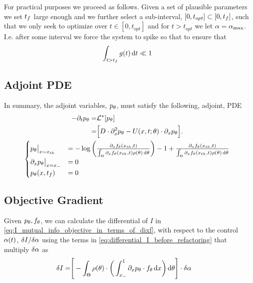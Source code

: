 \def \topt {{ t_{opt}}}

For practical purposes we proceed as follows. Given a set of plausible
parameters we set ${t_f}$ large enough and we further select a sub-interval,
$[0, \topt] \subset [0, \tf]$, such that we only seek to optimize over $t\in
[0, \topt]$ and for $t > \topt$ we let $\alpha= { \alpha_{\textrm{max}} }$. I.e. after some interval we
force the system to spike so that to ensure that $$\int_{t>{t_f}} g(t) \, \mathrm{d} t
\ll 1$$

\subsection{Adjoint PDE}
In summary, the adjoint variables, $p_{ \theta}$, must satisfy the following, adjoint,
PDE
\begin{equation}
\begin{gathered}
\begin{aligned}
-\di_t p_\th =&  \Lstar[p_\th]
\\ 		=&  \Big[ D\cdot \di^2_x p_\th - U(x,t;\th)   \cdot \di_x p_\th \Big].
\end{aligned}
\\
\begin{cases}
	p_\th \big|_{x=\xth} &=  -\log\left( \frac{\di_xf_\th(\xth, t)}
						{\int_\Theta \di_xf_\th(\xth, t)\rho(\th)\intd{\th} } \right) 
							- 1 
							+ \frac{\di_xf_\th(\xth, t)}
				   					{\int_\Theta \di_xf_\th(\xth, t)\rho(\th)\intd{\th} } $$
	\\
	\di_x p_\th  \big|_{x=\xmin} &= 0
	\\
	p_\th(x,\tf) &= 0
\end{cases}
\label{eq:adjoint_pde_OU}
\end{gathered}
\end{equation}

\subsection{Objective Gradient}
Given $p_{ \theta}, f_{ \theta}$, we can calculate the differential of $I$ in
\cref{eq:I_mutual_info_objective_in_terms_of_dixf}, with respect to the
control $\alpha(t)$, $\delta I / \delta \alpha$ using the terms in
\cref{eq:differential_I_before_refactoring} that multiply $\delta \alpha$ as 
\begin{align}
\delta I =&  \Bigg[ 
-\int_\Theta  \rho({ \theta}) \cdot \bigg(  
 \int_{ x_{-} }^{1} {\partial}_x p_{ \theta} \cdot f_{ \theta} \, \mathrm{d} x 
    \bigg) \, \mathrm{d} { \theta} \Bigg]\cdot \delta \alpha
    \label{eq:objective_gradient_continuous}
\end{align}

